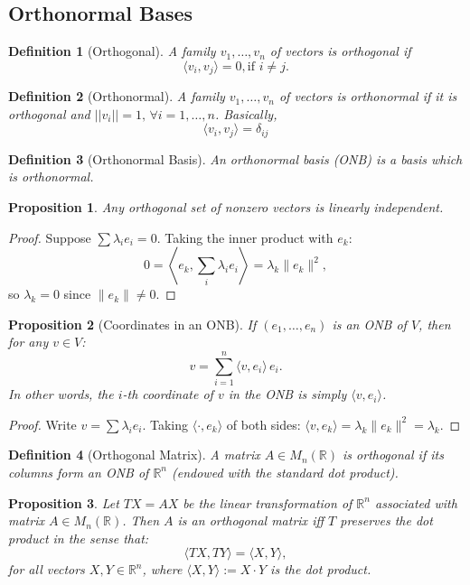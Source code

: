 \documentclass{article}
\newtheorem{definition}{Definition}
\newtheorem{proposition}{Proposition}
\begin{document}
\subsection{Orthonormal Bases}
\begin{definition}[Orthogonal]
    A family $v_1,\ldots,v_n$ of vectors is orthogonal if 
    \[\langle v_i,v_j \rangle =0, \text{if } i\neq j.\]
\end{definition}
\begin{definition}[Orthonormal]
    A family $v_1,\ldots,v_n$ of vectors is orthonormal if it is orthogonal and $||v_i|| = 1,\,\forall i=1,\ldots,n$. Basically,
    \[\langle v_i,v_j\rangle = \delta_{ij}\]
\end{definition}
\begin{definition}[Orthonormal Basis]
    An orthonormal basis (ONB) is a basis which is orthonormal.
\end{definition}
\begin{proposition}
    Any orthogonal set of nonzero vectors is linearly independent.
\end{proposition}
\begin{proof}
    Suppose $\sum \lambda_i e_i = 0$. Taking the inner product with $e_k$:
    \[0 = \left\langle e_k, \sum_i \lambda_i e_i\right\rangle = \lambda_k \|e_k\|^2,\]
    so $\lambda_k = 0$ since $\|e_k\| \neq 0$.
\end{proof}
\begin{proposition}[Coordinates in an ONB]
    If $(e_1,\ldots,e_n)$ is an ONB of $V$, then for any $v\in V$:
    \[v = \sum_{i=1}^n \langle v, e_i\rangle\, e_i.\]
    In other words, the $i$-th coordinate of $v$ in the ONB is simply $\langle v, e_i\rangle$.
\end{proposition}
\begin{proof}
    Write $v = \sum \lambda_i e_i$. Taking $\langle\cdot, e_k\rangle$ of both sides: $\langle v, e_k\rangle = \lambda_k\|e_k\|^2 = \lambda_k$.
\end{proof}
\begin{definition}[Orthogonal Matrix]
    A matrix $A \in M_n(\mathbb{R})$ is orthogonal if its columns form an ONB of $\mathbb{R}^n$ (endowed with the standard dot product).
\end{definition}
\begin{proposition}
    Let $TX=AX$ be the linear transformation of $\mathbb{R}^n$ associated with matrix $A \in M_n(\mathbb{R})$. Then $A$ is an orthogonal matrix iff $T$ preserves the dot product in the sense that:
    \[\langle TX,TY \rangle = \langle X,Y\rangle,\]
    for all vectors $X,Y \in \mathbb{R}^n$, where $\langle X,Y\rangle := X \cdot Y$ is the dot product.
\end{proposition}
\end{document}
